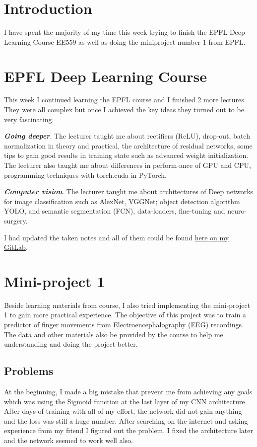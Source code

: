 \section{Introduction}
I have spent the majority of my time this week trying to finish the EPFL Deep Learning Course EE559 as well as doing the miniproject number 1 from EPFL\cite{miniproject1}.

\section{EPFL Deep Learning Course}
This week I continued learning the EPFL course and I finished 2 more lectures. They were all complex but once I achieved the key ideas they turned out to be very fascinating.

\textbf{\emph{Going deeper}}. The lecturer taught me about rectifiers (ReLU), drop-out, batch normalization in theory and practical, the architecture of residual networks, some tips to gain good results in training state such as advanced weight initialization. The lecturer also taught me about differences in perform-ance of GPU and CPU, programming techniques with torch.cuda in PyTorch.

\textbf{\emph{Computer vision}}. The lecturer taught me about architectures of Deep networks for image classification such as AlexNet, VGGNet\cite{vggnet}; object detection algorithm YOLO\cite{yolo}, and semantic segmentation (FCN)\cite{semanticseg}, data-loaders, fine-tuning and neuro-surgery.

I had updated the taken notes and all of them could be found \href{https://gitlab.com/tlvu2697/epfl--ee559--deep-learning}{here on my GitLab}.

\section{Mini-project 1}
Beside learning materials from course, I also tried implementing the mini-project 1 to gain more practical experience. The objective of this project was to train a predictor of finger movements from Electroencephalography (EEG) recordings\cite{eegrecord}. The data and other materials also be provided by the course to help me understanding and doing the project better.

\subsection{Problems}
At the beginning, I made a big mistake that prevent me from achieving any goals which was using the Sigmoid function at the last layer of my CNN architecture. After days of training with all of my effort, the network did not gain anything and the loss was still a huge number. After searching on the internet and asking experience from my friend I figured out the problem. I fixed the architecture later and the network seemed to work well also.

